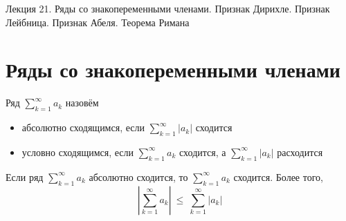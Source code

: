 \documentclass[11pt]{article}
\begin{document}
\begin{titlepage}
    \centering
    \vspace*{\fill}  %

    {\Huge Лекция 21. Ряды со знакопеременными членами. 
    Признак Дирихле. Признак Лейбница. Признак Абеля. 
    Теорема Римана}

    \vspace*{\fill}  %
\end{titlepage}

\setcounter{page}{1}

\section{Ряды со знакопеременными членами}

\begin{definition}
  Ряд $\displaystyle \sum_{k = 1}^{\infty} a_k$ назовём 
  \begin{itemize}
    \item абсолютно сходящимся, если $\displaystyle \sum_{k = 1}^{\infty} 
    \left\lvert a_k \right\rvert$ сходится
    \item условно сходящимся, если $\displaystyle \sum_{k = 1}^{\infty} a_k$ 
    сходится, а $\displaystyle \sum_{k = 1}^{\infty} \left\lvert a_k 
    \right\rvert$ расходится
  \end{itemize}
\end{definition}

\begin{theorem}
  Если ряд $\displaystyle \sum_{k = 1}^{\infty} a_k$ абсолютно сходится, то 
  $\displaystyle \sum_{k = 1}^{\infty} a_k$ сходится. Более того, 
  \[\left\lvert \sum_{k = 1}^{\infty} a_k \right\rvert \ \leq \ 
  \sum_{k = 1}^{\infty} \left\lvert a_k \right\rvert\]
\end{theorem}
\end{document}
